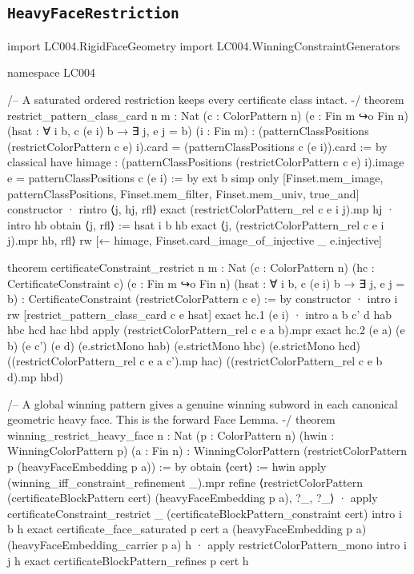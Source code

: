 \documentclass[11pt,reqno]{amsart}
\theoremstyle{definition}
\begin{document}
\subsection{\texorpdfstring{\texttt{HeavyFaceRestriction}}{HeavyFaceRestriction}}
\begin{LeanCode}
import LC004.RigidFaceGeometry
import LC004.WinningConstraintGenerators

namespace LC004

/-- A saturated ordered restriction keeps every certificate class intact. -/
theorem restrict_pattern_class_card {n m : Nat} (c : ColorPattern n)
    (e : Fin m ↪o Fin n)
    (hsat : ∀ i b, c (e i) b → ∃ j, e j = b) (i : Fin m) :
    (patternClassPositions (restrictColorPattern c e) i).card =
      (patternClassPositions c (e i)).card := by
  classical
  have himage : (patternClassPositions (restrictColorPattern c e) i).image e =
      patternClassPositions c (e i) := by
    ext b
    simp only [Finset.mem_image, patternClassPositions, Finset.mem_filter,
      Finset.mem_univ, true_and]
    constructor
    · rintro ⟨j, hj, rfl⟩
      exact (restrictColorPattern_rel c e i j).mp hj
    · intro hb
      obtain ⟨j, rfl⟩ := hsat i b hb
      exact ⟨j, (restrictColorPattern_rel c e i j).mpr hb, rfl⟩
  rw [← himage, Finset.card_image_of_injective _ e.injective]

theorem certificateConstraint_restrict {n m : Nat} (c : ColorPattern n)
    (hc : CertificateConstraint c) (e : Fin m ↪o Fin n)
    (hsat : ∀ i b, c (e i) b → ∃ j, e j = b) :
    CertificateConstraint (restrictColorPattern c e) := by
  constructor
  · intro i
    rw [restrict_pattern_class_card c e hsat]
    exact hc.1 (e i)
  · intro a b c' d hab hbc hcd hac hbd
    apply (restrictColorPattern_rel c e a b).mpr
    exact hc.2 (e a) (e b) (e c') (e d)
      (e.strictMono hab) (e.strictMono hbc) (e.strictMono hcd)
      ((restrictColorPattern_rel c e a c').mp hac)
      ((restrictColorPattern_rel c e b d).mp hbd)

/-- A global winning pattern gives a genuine winning subword in each
canonical geometric heavy face. This is the forward Face Lemma. -/
theorem winning_restrict_heavy_face {n : Nat} (p : ColorPattern n)
    (hwin : WinningColorPattern p) (a : Fin n) :
    WinningColorPattern (restrictColorPattern p (heavyFaceEmbedding p a)) := by
  obtain ⟨cert⟩ := hwin
  apply (winning_iff_constraint_refinement _).mpr
  refine ⟨restrictColorPattern (certificateBlockPattern cert) (heavyFaceEmbedding p a),
    ?_, ?_⟩
  · apply certificateConstraint_restrict _ (certificateBlockPattern_constraint cert)
    intro i b h
    exact certificate_face_saturated p cert a (heavyFaceEmbedding p a)
      (heavyFaceEmbedding_carrier p a) h
  · apply restrictColorPattern_mono
    intro i j h
    exact certificateBlockPattern_refines p cert h


\end{LeanCode}
\end{document}
